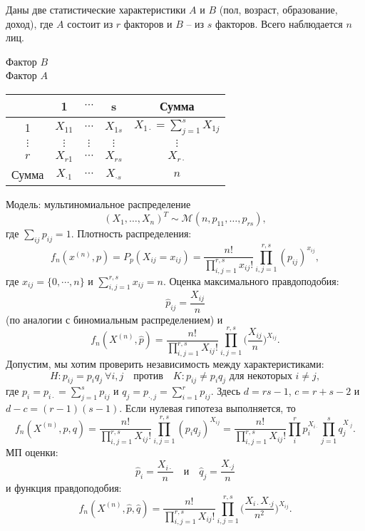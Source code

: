 \begin{exmp}
	Даны две статистические характеристики $A$ и $B$ (пол, возраст, образование, доход), где $A$ состоит из $r$ факторов и $B$ -- из $s$ факторов. Всего наблюдается $n$ лиц.
	\begin{center}
		\qquad\qquad  Фактор $B$ \\
		Фактор $A$
		\begin{tabular}{|c | c | c | c| c |}
			\hline
			& 1 & $\cdots$ & s & Сумма \\
			\hline
			1 & $X_{11}$ & $\cdots$ & $X_{1s}$ & $X_{1\cdot} = \sum_{j=1}^{s}X_{1j} $ \\
			\hline
			$\vdots$ & $\vdots$ & $\vdots$ & $\vdots$ & $\vdots$ \\
			\hline
			$r$ & $X_{r1}$ & $\cdots$ & $X_{rs}$ & $X_{r\cdot}$ \\
			\hline
			Сумма & $X_{\cdot 1}$ & $\cdots$ & $X_{\cdot s}$ & $n$ \\
			\hline
		\end{tabular}
    \end{center}
    Модель: мультиномиальное распределение
    \[(X_1, \dots, X_n)^T \sim \mathcal{M}(n,p_{11}, \dots, p_{rs}), \]
    где $\sum_{ij} p_{ij} = 1$. Плотность распределения:
    \[ f_n(x^{(n)}, p) = P_p(X_{ij}=x_{ij}) = \frac{n!}{\prod_{i,j=1}^{r,s} x_{ij}!} \prod_{i,j=1}^{r,s} (p_{ij})^{x_{ij}}, \]
    где $x_{ij} = \{0, \cdots, n\}$ и $\sum_{i,j=1}^{r,s} x_{ij} = n$. Оценка максимального правдоподобия:
    \[\hat{p}_{ij} = \frac{X_{ij}}{n}\]
    (по аналогии с биномиальным распределением) и
    \[ f_n(X^{(n)}, \hat{p}) = \frac{n!}{\prod_{i,j=1}^{r,s} X_{ij}!} \prod_{i,j=1}^{r,s} \Big(\frac{X_{ij}}{n}\Big)^{X_{ij}}.  \]
    Допустим, мы хотим проверить независимость между характеристиками:
    \[H:p_{ij} = p_i q_j \ \forall i,j \quad \text{против} \quad K: p_{ij} \neq p_i q_j \text{ для некоторых } i \neq j, \]
    где $p_i = p_{i \cdot} = \sum_{j=1}^{s}p_{ij}$ и $q_j = p_{\cdot, j} = \sum_{i=1}^{r}p_{ij}$. Здесь $d = rs-1$, $c = r + s - 2$ и $d-c = (r-1)(s-1)$. Если нулевая гипотеза выполняется, то
    \[ f_n(X^{(n)}, p, q) = \frac{n!}{\prod_{i,j=1}^{r,s} X_{ij}!} \prod_{i,j=1}^{r,s} (p_i q _j)^{X_{ij}} = \frac{n!}{\prod_{i,j=1}^{r,s} X_{ij}!} \prod_{i}^{r} p_i^{X_{i \cdot}} \prod_{j=1}^{s} q_j ^ {X_{\cdot j}}.   \]
    МП оценки:
    \[ \hat{p}_i = \frac{X_{i \cdot}}{n} \quad \text{и} \quad \hat{q}_j = \frac{X_{\cdot j}}{n} \]
    и функция правдоподобия:
    \[ f_n(X^{(n)}, \hat{p}, \hat{q}) = \frac{n!}{\prod_{i,j=1}^{r,s} X_{ij}!} \prod_{i,j=1}^{r,s} \Big( \frac{X_{i \cdot} X_{\cdot j}}{n^2} \Big)^{X_{ij}}. \]

\end{exmp}
